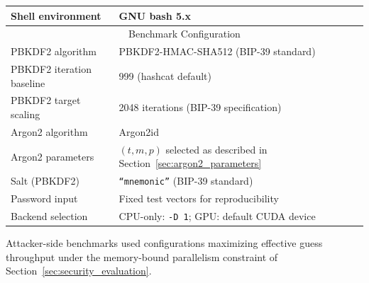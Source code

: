 \documentclass[mathematics,article,accept,pdftex,moreauthors]{Definitions/mdpi}
\begin{document}
\begin{table}[H]
\begin{tabularx}{\linewidth}{ll}
Shell environment & GNU bash 5.x \\
\midrule
\multicolumn{2}{c}{Benchmark Configuration} \\
\midrule
PBKDF2 algorithm & PBKDF2-HMAC-SHA512 (BIP-39 standard) \\
PBKDF2 iteration baseline & 999 (hashcat default) \\
PBKDF2 target scaling & 2048 iterations (BIP-39 specification) \\ %
Argon2 algorithm & Argon2id \\
Argon2 parameters & $(t,m,p)$ selected as described in Section~\ref{sec:argon2_parameters} \\
Salt (PBKDF2) & \texttt{``mnemonic''} (BIP-39 standard) \\
Password input & Fixed test vectors for reproducibility \\
Backend selection & CPU-only: \texttt{-D 1}; GPU: default CUDA device \\
\bottomrule
\end{tabularx}
\end{table}

{Attacker-side benchmarks used configurations maximizing effective guess throughput under the memory-bound parallelism constraint of Section~\ref{sec:security_evaluation}.}
\end{document}
